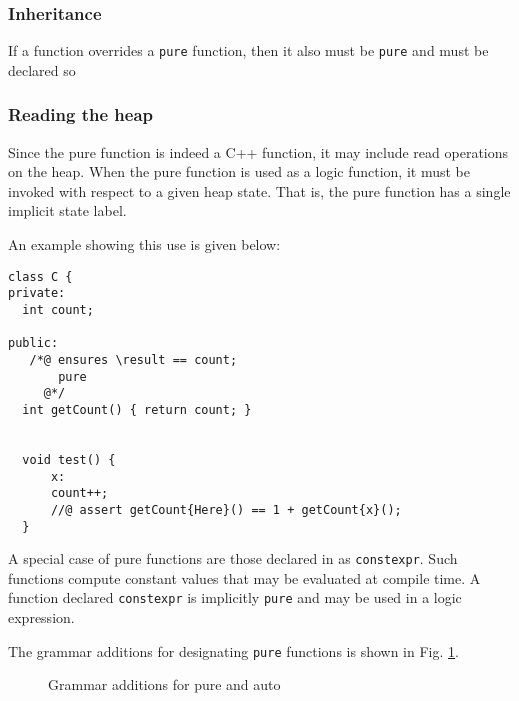 \subsubsection{Inheritance}
If a function overrides a \lstinline|pure| function, then it also must be \lstinline|pure| and must be declared so

\subsubsection*{Reading the heap}
Since the pure function is indeed a C++ function, it may include read operations on the heap. When the pure function is used as a logic function,
it must be invoked with respect to a given heap state. 
That is, the pure function has a single implicit state label.


An example showing this use is given below:
\begin{lstlisting}
class C {
private:
  int count;

public:
   /*@ ensures \result == count;
       pure
     @*/   
  int getCount() { return count; }
  
  
  void test() {
      x:
      count++;
      //@ assert getCount{Here}() == 1 + getCount{x}();
  }

\end{lstlisting}

A special case of pure functions are those declared in \lang{} as \lstinline|constexpr|.
Such functions compute constant values that may be evaluated at compile time. A function declared \lstinline|constexpr| is implicitly \lstinline|pure| and may be used in a logic expression.

The grammar additions for designating \lstinline|pure| functions is shown in Fig. \ref{fig:gram:pure}.

\begin{figure}
\begin{cadre}

\end{cadre}
\caption{Grammar additions for pure and auto}
\label{fig:gram:pure}
\end{figure}

